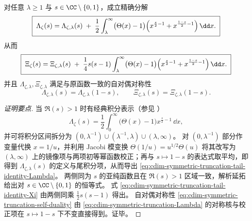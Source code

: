 \begin{theorem}[对称截断的尺度递归恒等式与尾积分误差项]\label{thm:cdim-symmetric-truncation-tail-identity}
对任意 \(\lambda\ge 1\) 与 \(s\in\CC\setminus\{0,1\}\)，成立精确分解
\begin{equation}\label{eq:cdim-symmetric-truncation-tail-identity-Lambda}
\boxed{\;
\Lambda_\zeta(s)
=\Lambda_{\zeta,\lambda}(s)
\;+\;\frac12\int_{\lambda}^{\infty}\bigl(\Theta(x)-1\bigr)
\Bigl(x^{\frac{s}{2}-1}+x^{\frac{1-s}{2}-1}\Bigr)\,\dd x.\;}
\end{equation}
从而
\begin{equation}\label{eq:cdim-symmetric-truncation-tail-identity-Xi}
\boxed{\;
\Xi_\zeta(s)
=\Xi_{\zeta,\lambda}(s)
\;+\;\frac14 s(s-1)\int_{\lambda}^{\infty}\bigl(\Theta(x)-1\bigr)
\Bigl(x^{\frac{s}{2}-1}+x^{\frac{1-s}{2}-1}\Bigr)\,\dd x.\;}
\end{equation}
并且 \(\Lambda_{\zeta,\lambda},\Xi_{\zeta,\lambda}\) 满足与原函数一致的自对偶对称性
\begin{equation}\label{eq:cdim-symmetric-truncation-self-duality}
\boxed{\;
\Lambda_{\zeta,\lambda}(s)=\Lambda_{\zeta,\lambda}(1-s),
\qquad
\Xi_{\zeta,\lambda}(s)=\Xi_{\zeta,\lambda}(1-s).\;}
\end{equation}
\end{theorem}
\begin{proof}[证明要点]
当 \(\Re(s)>1\) 时有经典积分表示（参见 \cite{PerezMarco2018NotesRH}）
\[
\Lambda_\zeta(s)=\frac12\int_0^\infty\bigl(\Theta(x)-1\bigr)x^{\frac{s}{2}-1}\,\dd x,
\]
并可将积分区间拆分为 \((0,\lambda^{-1})\cup(\lambda^{-1},\lambda)\cup(\lambda,\infty)\)。
对 \((0,\lambda^{-1})\) 部分作变量代换 \(x=1/u\)，并利用 Jacobi 模变换
\(
\Theta(1/u)=u^{1/2}\Theta(u)
\)
将其改写为 \((\lambda,\infty)\) 上的镜像项与两项初等幂函数校正；再与 \(s\mapsto 1-s\) 的表达式取平均，即得到 \(\Lambda_{\zeta,\lambda}(s)\) 的定义与尾积分项，从而导出 \eqref{eq:cdim-symmetric-truncation-tail-identity-Lambda}。
两侧同为 \(s\) 的亚纯函数且在 \(\Re(s)>1\) 区域一致，解析延拓给出对 \(s\in\CC\setminus\{0,1\}\) 的恒等式。
式 \eqref{eq:cdim-symmetric-truncation-tail-identity-Xi} 由两侧同乘 \(\tfrac12 s(s-1)\) 得出。
自对偶对称性 \eqref{eq:cdim-symmetric-truncation-self-duality} 由 \eqref{eq:cdim-symmetric-truncation-Lambda} 的对称核与校正项在 \(s\mapsto 1-s\) 下不变直接得到。证毕。
\end{proof}

